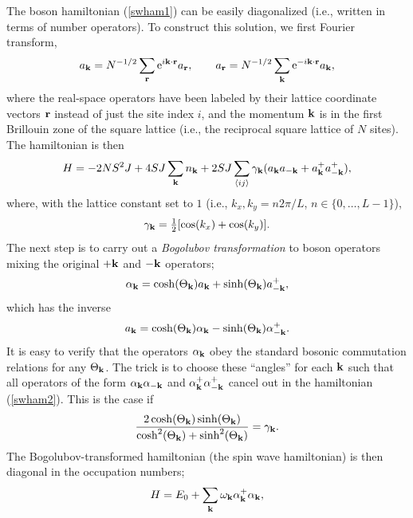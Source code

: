 \documentclass[draft,numberedheadings]{aipproc}
\newcommand{\half}{\hbox{$\frac{1}{2}$}}
\begin{document}
The boson hamiltonian (\ref{swham1}) can be easily diagonalized (i.e., written in terms of number operators). To construct this 
solution, we first Fourier transform,
\begin{equation}
a_{\bf k} = N^{-1/2} \sum_{\bf r} {\rm e}^{i {\bf k}\cdot {\bf r}}a_{\bf r},~~~~~~
a_{\bf r} = N^{-1/2} \sum_{\bf k} {\rm e}^{-i {\bf k}\cdot {\bf r}}a_{\bf k},
\end{equation}
where the real-space operators have been labeled by their lattice coordinate vectors ${\bf r}$ instead of just the site index $i$, and the momentum
${\bf k}$ is in the first Brillouin zone of the square lattice (i.e., the reciprocal square lattice of $N$ sites). The hamiltonian is then
\begin{equation}
H = -2NS^2J+4SJ\sum_{{\bf k}} n_{\bf k} + 2SJ\sum_{\langle ij\rangle} \gamma_{\bf k}(a_{\bf k}a_{\bf -k} + a^+_{\bf k}a^+_{\bf -k}),
\label{swham2}
\end{equation}
where, with the lattice constant set to $1$ (i.e., $k_x,k_y=n2\pi/L$, $n \in \{ 0,\ldots,L-1\}$),
\begin{equation}
\gamma_{\bf k} = \half [\cos(k_x)+\cos(k_y)].
\label{gammak}
\end{equation}
The next step is to carry out a {\it Bogolubov transformation} to boson operators mixing the original $+{\bf k}$ and $-{\bf k}$ operators;
\begin{equation}
\alpha_{\bf k} = \cosh(\Theta_{\bf k})a_{\bf k} + \sinh(\Theta_{\bf k})a^+_{-\bf k},
\end{equation}
which has the inverse
\begin{equation}
a_{\bf k} = \cosh(\Theta_{\bf k})\alpha_{\bf k} - \sinh(\Theta_{\bf k})\alpha^+_{-\bf k}.
\end{equation}
It is easy to verify that the operators $\alpha_{\bf k}$ obey the standard bosonic commutation relations for any $\Theta_{\bf k}$. The trick is to choose 
these ``angles'' for each ${\bf k}$ such that all operators of the form $\alpha_{\bf k}\alpha_{-\bf k}$ and $\alpha^+_{\bf k}\alpha^+_{-\bf k}$ 
cancel out in the hamiltonian (\ref{swham2}). This is the case if
\begin{equation}
\frac{2\cosh(\Theta_{\bf k})\sinh(\Theta_{\bf k})}{\cosh^2(\Theta_{\bf k})+\sinh^2(\Theta_{\bf k})}=\gamma_{\bf k}.
\end{equation}
The Bogolubov-transformed hamiltonian (the spin wave hamiltonian) is then diagonal in the occupation numbers;
\begin{equation}
H = E_0 + \sum_{{\bf k}} \omega_{\bf k} \alpha_{\bf k}^+\alpha_{\bf k},
\label{hsw}
\end{equation}
\end{document}

